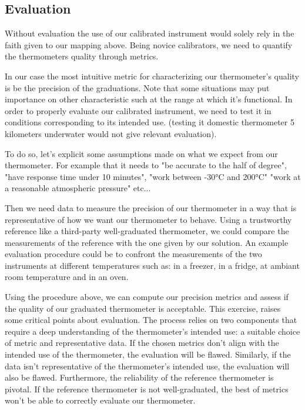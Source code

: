\begin{bibunit}
\subsection{Evaluation}

Without evaluation the use of our calibrated instrument would solely rely in the faith given to our mapping above.
Being novice calibrators, we need to quantify the thermometers quality through metrics.

In our case the most intuitive metric for characterizing our thermometer's quality is be the precision of the graduations.
Note that some situations may put importance on other characteristic such at the range at which it's functional.
  In order to properly evaluate our calibrated instrument, we need to test it in conditions corresponding to its intended use. (testing it domestic thermometer 5 kilometers underwater would not give relevant evaluation).

 To do so, let's explicit some assumptions made on what we expect from our thermometer.
  For example that it needs to "be accurate to the half of degree", "have response time under 10 minutes", "work between -30°C and 200°C" "work at a reasonable atmospheric pressure" etc...

Then we need data to measure the precision of our thermometer in a way that is representative of how we want our thermometer to behave. Using a trustworthy reference like a third-party well-graduated thermometer, we could compare the measurements of the reference with the one given by our solution.
  An example evaluation procedure could be to confront the measurements of the two instruments at different temperatures such as: in a freezer, in a fridge, at ambiant room temperature and in an oven.

Using the procedure above, we can compute our precision metrics and assess if the quality of our graduated thermometer is acceptable.
This exercise, raises some critical points about evaluation. The process relies on two components that require a deep understanding of the thermometer's intended use: a suitable choice of metric and representative data. If the chosen metrics don't align with the intended use of the thermometer, the evaluation will be flawed. Similarly, if the data isn't representative of the thermometer's intended use, the evaluation will also be flawed.
 Furthermore, the reliability of the reference thermometer is pivotal. If the reference thermometer is not well-graduated, the best of metrics won't be able to correctly evaluate our thermometer. 


\end{bibunit}
